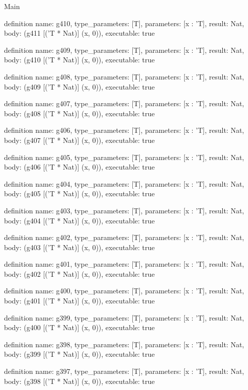 \begin{lexlean}{Main}
\begin{semanticmodule}
definition{
  name: g410,
  type_parameters: [T],
  parameters: [x : 'T],
  result: Nat,
  body: (g411 [('T * Nat)] (x, 0)),
  executable: true
}

definition{
  name: g409,
  type_parameters: [T],
  parameters: [x : 'T],
  result: Nat,
  body: (g410 [('T * Nat)] (x, 0)),
  executable: true
}

definition{
  name: g408,
  type_parameters: [T],
  parameters: [x : 'T],
  result: Nat,
  body: (g409 [('T * Nat)] (x, 0)),
  executable: true
}

definition{
  name: g407,
  type_parameters: [T],
  parameters: [x : 'T],
  result: Nat,
  body: (g408 [('T * Nat)] (x, 0)),
  executable: true
}

definition{
  name: g406,
  type_parameters: [T],
  parameters: [x : 'T],
  result: Nat,
  body: (g407 [('T * Nat)] (x, 0)),
  executable: true
}

definition{
  name: g405,
  type_parameters: [T],
  parameters: [x : 'T],
  result: Nat,
  body: (g406 [('T * Nat)] (x, 0)),
  executable: true
}

definition{
  name: g404,
  type_parameters: [T],
  parameters: [x : 'T],
  result: Nat,
  body: (g405 [('T * Nat)] (x, 0)),
  executable: true
}

definition{
  name: g403,
  type_parameters: [T],
  parameters: [x : 'T],
  result: Nat,
  body: (g404 [('T * Nat)] (x, 0)),
  executable: true
}

definition{
  name: g402,
  type_parameters: [T],
  parameters: [x : 'T],
  result: Nat,
  body: (g403 [('T * Nat)] (x, 0)),
  executable: true
}

definition{
  name: g401,
  type_parameters: [T],
  parameters: [x : 'T],
  result: Nat,
  body: (g402 [('T * Nat)] (x, 0)),
  executable: true
}

definition{
  name: g400,
  type_parameters: [T],
  parameters: [x : 'T],
  result: Nat,
  body: (g401 [('T * Nat)] (x, 0)),
  executable: true
}

definition{
  name: g399,
  type_parameters: [T],
  parameters: [x : 'T],
  result: Nat,
  body: (g400 [('T * Nat)] (x, 0)),
  executable: true
}

definition{
  name: g398,
  type_parameters: [T],
  parameters: [x : 'T],
  result: Nat,
  body: (g399 [('T * Nat)] (x, 0)),
  executable: true
}

definition{
  name: g397,
  type_parameters: [T],
  parameters: [x : 'T],
  result: Nat,
  body: (g398 [('T * Nat)] (x, 0)),
  executable: true
}


\end{semanticmodule}
\end{lexlean}
